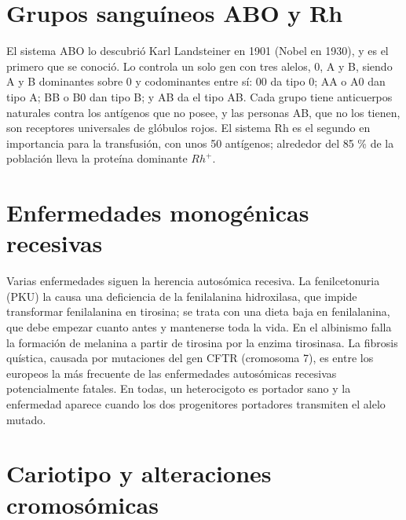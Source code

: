 \documentclass{book}
\begin{document}

\section{Grupos sanguíneos ABO y Rh}

El sistema ABO lo descubrió Karl Landsteiner en 1901 (Nobel en 1930), y es el primero que se conoció. Lo controla un solo gen con tres alelos, 0, A y B, siendo A y B dominantes sobre 0 y codominantes entre sí: 00 da tipo 0; AA o A0 dan tipo A; BB o B0 dan tipo B; y AB da el tipo AB. Cada grupo tiene anticuerpos naturales contra los antígenos que no posee, y las personas AB, que no los tienen, son receptores universales de glóbulos rojos. El sistema Rh es el segundo en importancia para la transfusión, con unos 50 antígenos; alrededor del 85 \% de la población lleva la proteína dominante \(Rh^{+}\).


\section{Enfermedades monogénicas recesivas}

Varias enfermedades siguen la herencia autosómica recesiva. La fenilcetonuria (PKU) la causa una deficiencia de la fenilalanina hidroxilasa, que impide transformar fenilalanina en tirosina; se trata con una dieta baja en fenilalanina, que debe empezar cuanto antes y mantenerse toda la vida. En el albinismo falla la formación de melanina a partir de tirosina por la enzima tirosinasa. La fibrosis quística, causada por mutaciones del gen CFTR (cromosoma 7), es entre los europeos la más frecuente de las enfermedades autosómicas recesivas potencialmente fatales. En todas, un heterocigoto es portador sano y la enfermedad aparece cuando los dos progenitores portadores transmiten el alelo mutado.


\section{Cariotipo y alteraciones cromosómicas}
\end{document}
